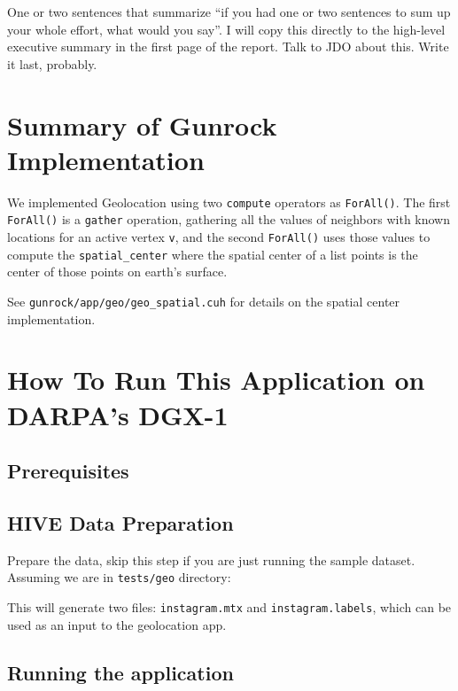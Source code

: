 \documentclass[10pt,article,oneside]{memoir}
\begin{document}
One or two sentences that summarize ``if you had one or two sentences to
sum up your whole effort, what would you say''. I will copy this
directly to the high-level executive summary in the first page of the
report. Talk to JDO about this. Write it last, probably.

\section{Summary of Gunrock
Implementation}\label{summary-of-gunrock-implementation}

We implemented Geolocation using two \texttt{compute} operators as
\texttt{ForAll()}. The first \texttt{ForAll()} is a \texttt{gather}
operation, gathering all the values of neighbors with known locations
for an active vertex \texttt{v}, and the second \texttt{ForAll()} uses
those values to compute the \texttt{spatial\_center} where the spatial
center of a list points is the center of those points on earth's
surface.

See \texttt{gunrock/app/geo/geo\_spatial.cuh} for details on the spatial
center implementation.

\section{How To Run This Application on DARPA's
DGX-1}\label{how-to-run-this-application-on-darpas-dgx-1}

\subsection{Prerequisites}\label{prerequisites}

\subsection{HIVE Data Preparation}\label{hive-data-preparation}

Prepare the data, skip this step if you are just running the sample
dataset. Assuming we are in \texttt{tests/geo} directory:

This will generate two files: \texttt{instagram.mtx} and
\texttt{instagram.labels}, which can be used as an input to the
geolocation app.

\subsection{Running the application}\label{running-the-application}
\end{document}
